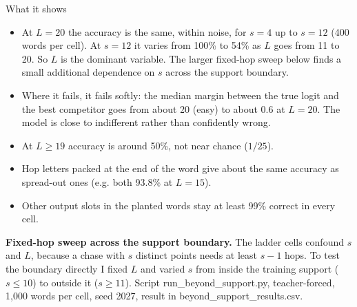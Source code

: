 \documentclass[paper=a4,fontsize=11pt,DIV=11,parskip=half,headings=small,numbers=noendperiod]{scrartcl}
\DeclareRobustCommand{\lead}[1]{\textsf{\bfseries\color{accent}#1}}
\DeclareRobustCommand{\code}[1]{{\fontseries{m}\ttfamily #1}}
\begin{document}
\begin{findbox}{What it shows}
\begin{itemize}
\item At $L=20$ the accuracy is the same, within noise, for $s=4$ up to $s=12$ (400 words per cell). At $s=12$
  it varies from 100\% to 54\% as $L$ goes from 11 to 20. So $L$ is the dominant variable. The larger fixed-hop
  sweep below finds a small additional dependence on $s$ across the support boundary.
\item Where it fails, it fails softly: the median margin between the true logit and the best competitor goes
  from about 20 (easy) to about 0.6 at $L=20$. The model is close to indifferent rather than confidently wrong.
\item At $L\ge19$ accuracy is around 50\%, not near chance ($1/25$).
\item Hop letters packed at the end of the word give about the same accuracy as spread-out ones (e.g. both
  93.8\% at $L=15$).
\item Other output slots in the planted words stay at least 99\% correct in every cell.
\end{itemize}
\end{findbox}

\lead{Fixed-hop sweep across the support boundary.} The ladder cells confound $s$ and $L$, because a chase with
$s$ distinct points needs at least $s-1$ hops. To test the boundary directly I fixed $L$ and varied $s$ from
inside the training support ($s\le10$) to outside it ($s\ge11$). Script
\code{run\_\allowbreak{}beyond\_\allowbreak{}support.\allowbreak{}py}, teacher-forced, 1,000 words per cell,
seed 2027, result in \code{beyond\_\allowbreak{}support\_\allowbreak{}results.\allowbreak{}csv}.
\end{document}

